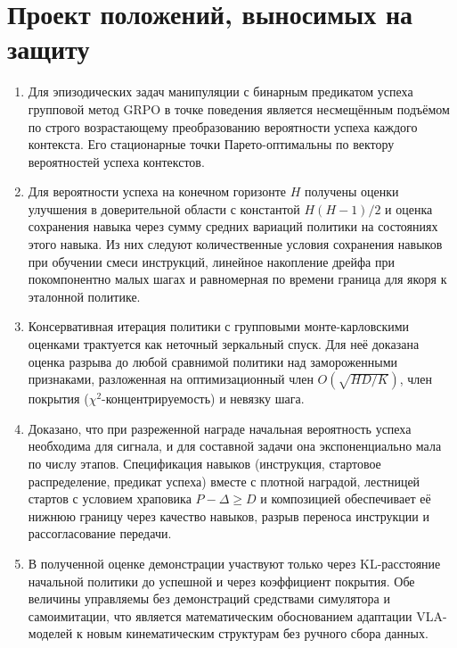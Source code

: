 \documentclass[11pt,a4paper]{article}
\theoremstyle{plain}
\theoremstyle{definition}
\theoremstyle{remark}
\begin{document}
\section{Проект положений, выносимых на защиту}\label{sec:defense}

\begin{enumerate}
\item Для эпизодических задач манипуляции с бинарным предикатом успеха групповой метод GRPO в точке поведения является несмещённым подъёмом по строго возрастающему преобразованию вероятности успеха каждого контекста. Его стационарные точки Парето-оптимальны по вектору вероятностей успеха контекстов.
\item Для вероятности успеха на конечном горизонте $H$ получены оценки улучшения в доверительной области с константой $H(H-1)/2$ и оценка сохранения навыка через сумму средних вариаций политики на состояниях этого навыка. Из них следуют количественные условия сохранения навыков при обучении смеси инструкций, линейное накопление дрейфа при покомпонентно малых шагах и равномерная по времени граница для якоря к эталонной политике.
\item Консервативная итерация политики с групповыми монте-карловскими оценками трактуется как неточный зеркальный спуск. Для неё доказана оценка разрыва до любой сравнимой политики над замороженными признаками, разложенная на оптимизационный член $O(\sqrt{HD/K})$, член покрытия ($\chi^2$-концентрируемость) и невязку шага.
\item Доказано, что при разреженной награде начальная вероятность успеха необходима для сигнала, и для составной задачи она экспоненциально мала по числу этапов. Спецификация навыков (инструкция, стартовое распределение, предикат успеха) вместе с плотной наградой, лестницей стартов с условием храповика $P-\Delta\ge D$ и композицией обеспечивает её нижнюю границу через качество навыков, разрыв переноса инструкции и рассогласование передачи.
\item В полученной оценке демонстрации участвуют только через KL-расстояние начальной политики до успешной и через коэффициент покрытия. Обе величины управляемы без демонстраций средствами симулятора и самоимитации, что является математическим обоснованием адаптации VLA-моделей к новым кинематическим структурам без ручного сбора данных.
\end{enumerate}

\appendix
\end{document}
